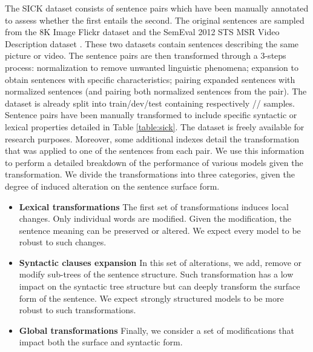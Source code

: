 The SICK dataset \parencite{marelli_14} consists of  sentence pairs which have been manually annotated to assess whether the first entails the second. The original sentences are sampled from the 8K Image Flickr dataset \cite{dhodosh_13} and the SemEval 2012 STS MSR Video Description dataset \cite{agirre_12}. These two datasets contain sentences describing the same picture or video. The sentence pairs are then transformed through a 3-steps process: normalization to remove unwanted linguistic phenomena; expansion to obtain sentences with specific characteristics; pairing expanded sentences with normalized sentences (and pairing both normalized sentences from the pair).
The dataset is already split into train/dev/test containing respectively // samples. Sentence pairs have been manually transformed to include specific syntactic or lexical properties detailed in Table \ref{table:sick}. The dataset is freely available for research purposes. Moreover, some additional indexes detail the transformation that was applied to one of the sentences from each pair. We use this information to perform a detailed breakdown of the performance of various models given the transformation. We divide the transformations into three categories, given the degree of induced alteration on the sentence surface form.

\begin{itemize}
    \item \textbf{Lexical transformations} The first set of transformations induces local changes. Only individual words are modified. Given the modification, the sentence meaning can be preserved or altered. We expect every model to be robust to such changes. 
    \item \textbf{Syntactic clauses expansion} In this set of alterations, we add, remove or modify sub-trees of the sentence structure. Such transformation has a low impact on the syntactic tree structure but can deeply transform the surface form of the sentence. We expect strongly structured models to be more robust to such transformations.
    \item \textbf{Global transformations} Finally, we consider a set of modifications that impact both the surface and syntactic form.
\end{itemize}

